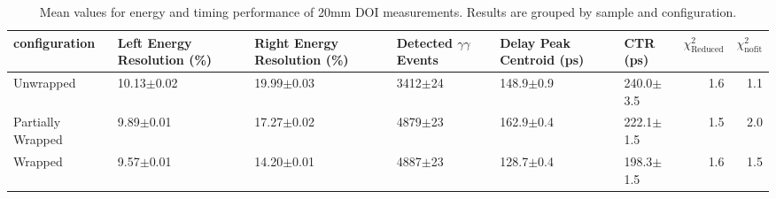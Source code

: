 \begin{table}
\caption{\label{doictrresults-20} Mean values for energy and timing performance of 20mm DOI measurements. Results are grouped by sample and configuration.}
\begin{tabular}{llllllrr}
\hline
configuration & Left Energy Resolution (\%) & Right Energy Resolution (\%) & Detected $\gamma\gamma$ Events & Delay Peak Centroid (ps)  & CTR (ps) &  $\chi^2_\text{Reduced}$ &  $\chi^2_\text{nofit}$ \\
\hline
Unwrapped     &  10.13$\pm$0.02 &  19.99$\pm$0.03 &  3412$\pm$24 &  148.9$\pm$0.9 &  240.0$\pm$3.5 &        1.6 &    1.1 \\
Partially Wrapped   &   9.89$\pm$0.01 &  17.27$\pm$0.02 &  4879$\pm$23 &  162.9$\pm$0.4 &  222.1$\pm$1.5 &        1.5 &    2.0 \\
Wrapped       &   9.57$\pm$0.01 &  14.20$\pm$0.01 &  4887$\pm$23 &  128.7$\pm$0.4 &  198.3$\pm$1.5 &        1.6 &    1.5 \\
\hline
\end{tabular}
\end{table}


